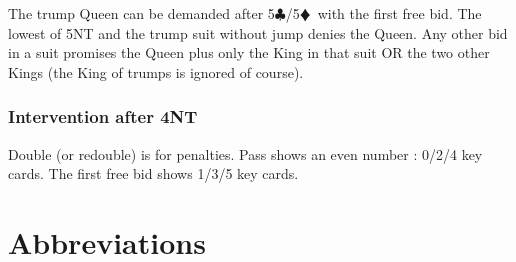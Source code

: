 \documentclass[a4paper]{article}
\newcommand{\BC}{\textcolor{OliveGreen}{$\clubsuit$}}
\newcommand{\BD}{\textcolor{RedOrange}{$\vardiamondsuit$}}
\begin{document}
The trump Queen can be demanded after 5\BC /5\BD\ with the first free bid. 
The lowest of 5NT and the trump suit without jump denies the Queen. Any other
bid in a suit promises the Queen plus only the King in that suit OR the two
other Kings (the King of trumps is ignored of course).
\bigbreak
\subsubsection{Intervention after 4NT}

Double (or redouble) is for penalties. Pass shows an even number : 0/2/4 key
cards. The first free bid shows 1/3/5 key cards.
\bigbreak
\section{Abbreviations}
\end{document}
